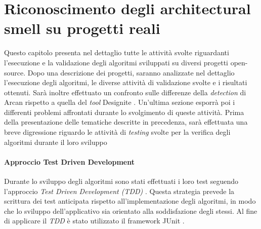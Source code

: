\section{Riconoscimento degli architectural smell su progetti reali}
    Questo capitolo presenta nel dettaglio tutte le attività svolte riguardanti l'esecuzione e la validazione degli algoritmi sviluppati su diversi progetti open-source. 
    Dopo una descrizione dei progetti, saranno analizzate nel dettaglio l'esecuzione degli algoritmi, le diverse attività di validazione svolte e i risultati ottenuti.  
    Sarà inoltre effettuato un confronto sulle differenze della \textit{detection} di Arcan rispetto a quella del \textit{tool} Designite \cite{Designite}.
    Un'ultima sezione esporrà poi i differenti problemi affrontati durante lo svolgimento di queste attività.
    Prima della presentazione delle tematiche descritte in precedenza, sarà effettuata una breve digressione riguardo le attività di \textit{testing} svolte per la verifica degli algoritmi durante il loro sviluppo %

    \paragraph{Approccio Test Driven Development}
        Durante lo sviluppo degli algoritmi sono stati effettuati i loro test seguendo l'approccio \textit{Test Driven Development (TDD)} \cite{beck2003testdrivendev}. Questa strategia prevede la scrittura dei test anticipata rispetto all'implementazione degli algoritmi, in modo che lo sviluppo dell'applicativo sia orientato alla soddisfazione degli stessi. Al fine di applicare il \textit{TDD} è stato utilizzato il framework JUnit \cite{JunitWebsite}.
        
